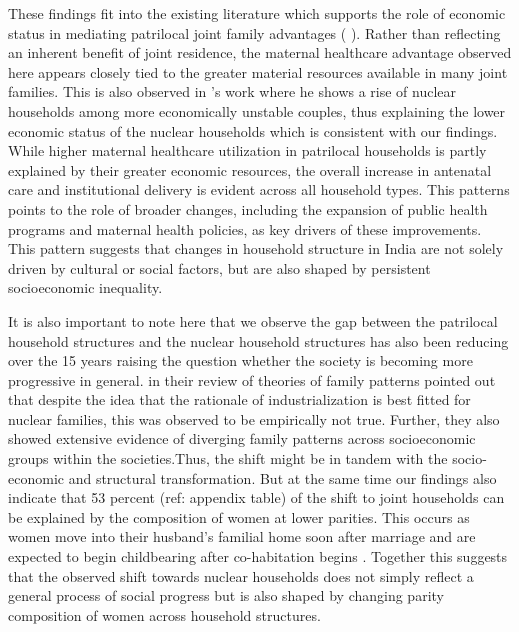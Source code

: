 \documentclass[12pt]{article}
\begin{document}
These findings fit into the existing literature which supports the role of economic status in mediating patrilocal joint family advantages (\cite{allendorf2013going} \cite{breton2021modernisation}). Rather than reflecting an inherent benefit of joint residence, the maternal healthcare advantage observed here appears closely tied to the greater material resources available in many joint families. This is also observed in \cite{breton2021modernisation}'s work where he shows a rise of nuclear households among more economically unstable couples, thus explaining the lower economic status of the nuclear households which is consistent with our findings. While higher maternal healthcare utilization in patrilocal households is partly explained by their greater economic resources, the overall increase in antenatal care and institutional delivery is evident across all household types. This patterns points to the role of broader changes, including the expansion of public health programs and maternal health policies, as key drivers of these improvements. This pattern suggests that changes in household structure in India are not solely driven by cultural or social factors, but are also shaped by persistent socioeconomic inequality. 

It is also important to note here that we observe the gap between the patrilocal household structures and the nuclear household structures has also been reducing over the 15 years raising the question whether the society is becoming more progressive in general. \cite{pesando2019rethinking} in their review of \cite{goode1963world} theories of family patterns pointed out that despite the idea that the rationale of industrialization is best fitted for nuclear families, this was observed to be empirically not true. Further, they also showed extensive evidence of diverging family patterns across socioeconomic groups within the societies.Thus, the shift might be in tandem with the socio-economic and structural transformation.  But at the same time our findings also indicate that 53 percent (ref: appendix table) of the shift to joint households can be explained by the composition of women at lower parities. This occurs as women move into their husband’s familial home soon after marriage \cite{breton2021modernisation} and are expected to begin childbearing after co-habitation begins \cite{ibarra2020desire}. Together this suggests that the observed shift towards nuclear households does not simply reflect a general process of social progress but is also shaped by changing parity composition of women across household structures. 
\end{document}
